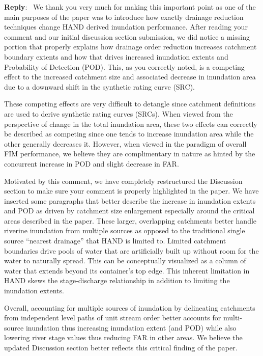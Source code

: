 \documentclass[11pt]{article}
\newcounter{reviewer}
\newcounter{point}[reviewer]
\newenvironment{reply}
   {\medskip \noindent \begin{sf}\textbf{Reply}:\  }
   {\medskip \end{sf}}
\begin{document}
\begin{reply}
We thank you very much for making this important point as one of the main purposes of the paper was to introduce how exactly drainage reduction techniques change HAND derived inundation performance.
After reading your comment and our initial discussion section submission, we did notice a missing portion that properly explains how drainage order reduction increases catchment boundary extents and how that drives increased inundation extents and Probability of Detection (POD).
This, as you correctly noted, is a competing effect to the increased catchment size and associated decrease in inundation area due to a downward shift in the synthetic rating curve (SRC).

These competing effects are very difficult to detangle since catchment definitions are used to derive synthetic rating curves (SRCs).
When viewed from the perspective of change in the total inundation area, these two effects can correctly be described as competing since one tends to increase inundation area while the other generally decreases it.
However, when viewed in the paradigm of overall FIM performance, we believe they are complimentary in nature as hinted by the concurrent increase in POD and slight decrease in FAR.

Motivated by this comment, we have completely restructured the Discussion section to make sure your comment is properly highlighted in the paper.
We have inserted some paragraphs that better describe the increase in inundation extents and POD as driven by catchment size enlargement especially around the critical areas described in the paper.
These larger, overlapping catchments better handle riverine inundation from multiple sources as opposed to the traditional single source ``nearest drainage'' that HAND is limited to.
Limited catchment boundaries drive pools of water that are artificially built up without room for the water to naturally spread.
This can be conceptually visualized as a column of water that extends beyond its container's top edge.
This inherent limitation in HAND skews the stage-discharge relationship in addition to limiting the inundation extents.

Overall, accounting for multiple sources of inundation by delineating catchments from independent level paths of unit stream order better accounts for multi-source inundation thus increasing inundation extent (and POD) while also lowering river stage values thus reducing FAR in other areas.
We believe the updated Discussion section better reflects this critical finding of the paper.
\end{reply}
\end{document}
